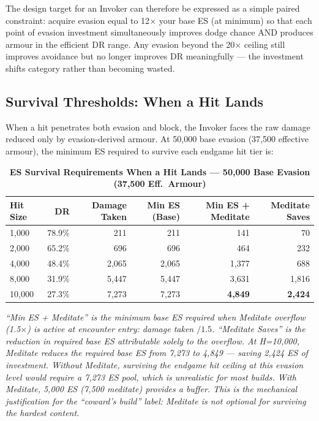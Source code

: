 \documentclass[12pt, letterpaper]{article}
\begin{document}
The design target for an Invoker can therefore be expressed as a simple paired constraint: acquire evasion equal to 12$\times$ your base ES (at minimum) so that each point of evasion investment simultaneously improves dodge chance AND produces armour in the efficient DR range. Any evasion beyond the 20$\times$ ceiling still improves avoidance but no longer improves DR meaningfully --- the investment shifts category rather than becoming wasted.

\subsection*{Survival Thresholds: When a Hit Lands}

When a hit penetrates both evasion and block, the Invoker faces the raw damage reduced only by evasion-derived armour. At 50{,}000 base evasion (37{,}500 effective armour), the minimum ES required to survive each endgame hit tier is:

\begin{table}[htbp]
\centering
\caption{\textbf{ES Survival Requirements When a Hit Lands --- 50{,}000 Base Evasion (37{,}500 Eff.\ Armour)}}
\begin{tabular}{lrrrrr}
\toprule
\textbf{Hit Size} & \textbf{DR} & \textbf{Damage Taken} & \textbf{Min ES (Base)} & \textbf{Min ES + Meditate} & \textbf{Meditate Saves} \\
\midrule
\rowcolor{rowalt} 1{,}000 & 78.9\% & 211 & 211 & 141 & 70 \\
2{,}000 & 65.2\% & 696 & 696 & 464 & 232 \\
\rowcolor{rowalt} 4{,}000 & 48.4\% & 2{,}065 & 2{,}065 & 1{,}377 & 688 \\
8{,}000 & 31.9\% & 5{,}447 & 5{,}447 & 3{,}631 & 1{,}816 \\
\rowcolor{rowhi} 10{,}000 & 27.3\% & 7{,}273 & 7{,}273 & \textbf{4{,}849} & \textbf{2{,}424} \\
\bottomrule
\end{tabular}
\smallskip
\begin{minipage}{\linewidth}
\small\textit{``Min ES + Meditate'' is the minimum \textit{base} ES required when Meditate overflow (1.5$\times$) is active at encounter entry: damage taken $/ 1.5$. ``Meditate Saves'' is the reduction in required base ES attributable solely to the overflow. At H=10{,}000, Meditate reduces the required base ES from 7{,}273 to 4{,}849 --- saving 2{,}424 ES of investment. Without Meditate, surviving the endgame hit ceiling at this evasion level would require a 7{,}273 ES pool, which is unrealistic for most builds. With Meditate, 5{,}000 ES (7{,}500 meditate) provides a buffer. This is the mechanical justification for the ``coward's build'' label: Meditate is not optional for surviving the hardest content.}
\end{minipage}
\end{table}
\end{document}
